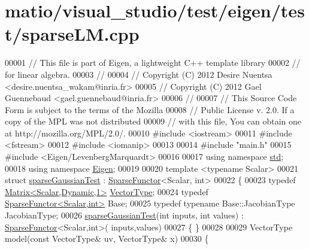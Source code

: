 \hypertarget{matio_2visual__studio_2test_2eigen_2test_2sparse_l_m_8cpp_source}{}\section{matio/visual\+\_\+studio/test/eigen/test/sparse\+LM.cpp}
\label{matio_2visual__studio_2test_2eigen_2test_2sparse_l_m_8cpp_source}

\begin{DoxyCode}
00001 \textcolor{comment}{// This file is part of Eigen, a lightweight C++ template library}
00002 \textcolor{comment}{// for linear algebra.}
00003 \textcolor{comment}{//}
00004 \textcolor{comment}{// Copyright (C) 2012 Desire Nuentsa <desire.nuentsa\_wakam@inria.fr>}
00005 \textcolor{comment}{// Copyright (C) 2012 Gael Guennebaud <gael.guennebaud@inria.fr>}
00006 \textcolor{comment}{//}
00007 \textcolor{comment}{// This Source Code Form is subject to the terms of the Mozilla}
00008 \textcolor{comment}{// Public License v. 2.0. If a copy of the MPL was not distributed}
00009 \textcolor{comment}{// with this file, You can obtain one at http://mozilla.org/MPL/2.0/.}
00010 \textcolor{preprocessor}{#include <iostream>}
00011 \textcolor{preprocessor}{#include <fstream>}
00012 \textcolor{preprocessor}{#include <iomanip>}
00013 
00014 \textcolor{preprocessor}{#include "main.h"}
00015 \textcolor{preprocessor}{#include <Eigen/LevenbergMarquardt>}
00016 
00017 \textcolor{keyword}{using namespace }\hyperlink{namespacestd}{std};
00018 \textcolor{keyword}{using namespace }\hyperlink{namespace_eigen}{Eigen};
00019 
00020 \textcolor{keyword}{template} <\textcolor{keyword}{typename} Scalar>
00021 \textcolor{keyword}{struct }\hyperlink{structsparse_gaussian_test}{sparseGaussianTest} : \hyperlink{struct_eigen_1_1_sparse_functor}{SparseFunctor}<Scalar, int>
00022 \{
00023   \textcolor{keyword}{typedef} \hyperlink{group___core___module}{Matrix<Scalar,Dynamic,1>} \hyperlink{struct_vector_type}{VectorType};
00024   \textcolor{keyword}{typedef} \hyperlink{struct_eigen_1_1_sparse_functor}{SparseFunctor<Scalar,int>} Base;
00025   \textcolor{keyword}{typedef} \textcolor{keyword}{typename} Base::JacobianType JacobianType;
00026   \hyperlink{structsparse_gaussian_test}{sparseGaussianTest}(\textcolor{keywordtype}{int} inputs, \textcolor{keywordtype}{int} values) : \hyperlink{struct_eigen_1_1_sparse_functor}{SparseFunctor}<Scalar,int>(
      inputs,values)
00027   \{ \}
00028   
00029   VectorType model(\textcolor{keyword}{const} VectorType& uv, VectorType& x)
00030   \{

\end{DoxyCode}
